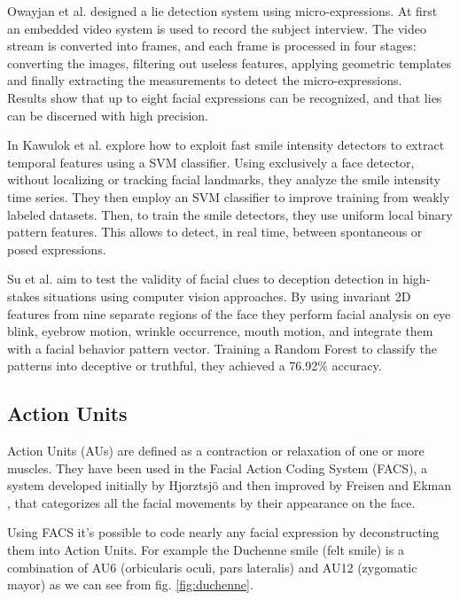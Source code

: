 Owayjan et al. \cite{6462897} designed a lie detection system using micro-expressions. At first an embedded video system is used to record the subject interview. The video stream is converted into frames, and each frame is processed in four stages: converting the images, filtering out useless features, applying geometric templates and finally extracting the measurements to detect the micro-expressions. \\
Results show that up to eight facial expressions can be recognized, and that lies can be discerned with high precision.

In \cite{10.1007/978-3-319-47955-2_27} Kawulok et al. explore how to exploit fast smile intensity detectors to extract temporal features using a SVM classifier. Using exclusively a face detector, without localizing or tracking facial landmarks, they analyze the smile intensity time series. They then employ an SVM classifier to improve training from weakly labeled datasets. Then, to train the smile detectors, they use uniform local binary pattern features. This allows to detect, in real time, between spontaneous or posed expressions.

Su et al. \cite{SU201652} aim to test the validity of facial clues to deception detection in high-stakes situations using computer vision approaches. By using invariant 2D features from nine separate regions of the face they perform facial analysis on eye blink, eyebrow motion, wrinkle occurrence, mouth motion, and integrate them with a facial behavior pattern vector. Training a Random Forest to classify the patterns into deceptive or truthful, they achieved a 76.92\% accuracy.

\subsection{Action Units} \label{au}
Action Units (AUs) are defined as a contraction or relaxation of one or more muscles. They have been used in the Facial Action Coding System (FACS), a system developed initially by Hjorztsjö \cite{facsCH} and then improved by Freisen and Ekman \cite{facs1978}, that categorizes all the facial movements by their appearance on the face.

Using FACS it's possible to code nearly any facial expression by deconstructing them into Action Units. For example the Duchenne smile (felt smile) is a combination of AU6 (orbicularis oculi, pars lateralis) and AU12 (zygomatic mayor) as we can see from fig. \ref{fig:duchenne}.

